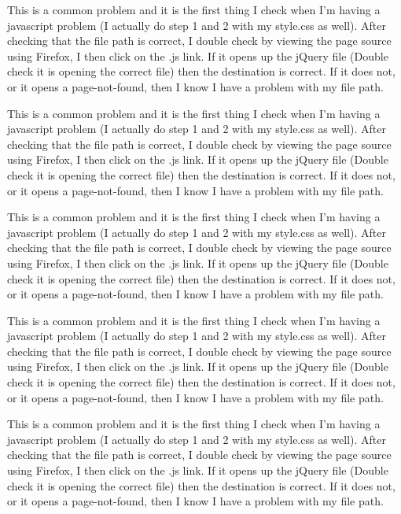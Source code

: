 



This is a common problem and it is the first thing I check when I’m having a javascript problem (I actually do step 1 and 2 with my style.css as well). After checking that the file path is correct, I double check by viewing the page source using Firefox, I then click on the .js link. If it opens up the jQuery file (Double check it is opening the correct file) then the destination is correct. If it does not, or it opens a page-not-found, then I know I have a problem with my file path.


This is a common problem and it is the first thing I check when I’m having a javascript problem (I actually do step 1 and 2 with my style.css as well). After checking that the file path is correct, I double check by viewing the page source using Firefox, I then click on the .js link. If it opens up the jQuery file (Double check it is opening the correct file) then the destination is correct. If it does not, or it opens a page-not-found, then I know I have a problem with my file path.


This is a common problem and it is the first thing I check when I’m having a javascript problem (I actually do step 1 and 2 with my style.css as well). After checking that the file path is correct, I double check by viewing the page source using Firefox, I then click on the .js link. If it opens up the jQuery file (Double check it is opening the correct file) then the destination is correct. If it does not, or it opens a page-not-found, then I know I have a problem with my file path.


This is a common problem and it is the first thing I check when I’m having a javascript problem (I actually do step 1 and 2 with my style.css as well). After checking that the file path is correct, I double check by viewing the page source using Firefox, I then click on the .js link. If it opens up the jQuery file (Double check it is opening the correct file) then the destination is correct. If it does not, or it opens a page-not-found, then I know I have a problem with my file path.


This is a common problem and it is the first thing I check when I’m having a javascript problem (I actually do step 1 and 2 with my style.css as well). After checking that the file path is correct, I double check by viewing the page source using Firefox, I then click on the .js link. If it opens up the jQuery file (Double check it is opening the correct file) then the destination is correct. If it does not, or it opens a page-not-found, then I know I have a problem with my file path.


